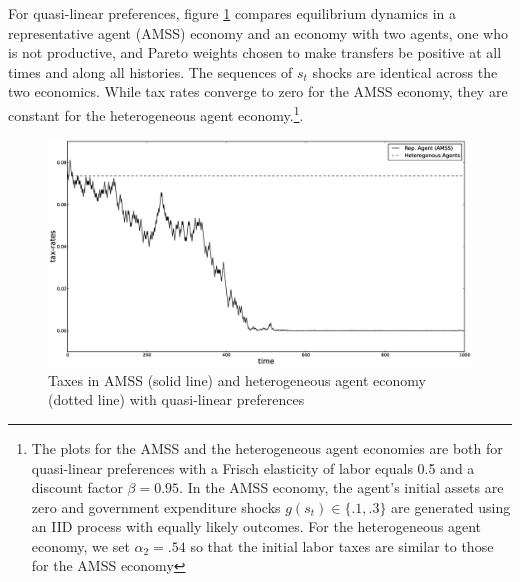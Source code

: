 \documentclass[thmsb,11pt]{article}
\begin{document}
For quasi-linear preferences, figure \ref{fig: AMSS vs BEGS} compares equilibrium dynamics in a
representative agent (AMSS) economy and an economy with two agents, one who
is not productive, and  Pareto weights chosen to make
transfers be positive at all times  and along all  histories. The sequences of $s_t$ shocks are identical across the two economics.
 While tax rates converge to zero for the AMSS economy, they are constant for the heterogeneous agent economy.\footnote{The plots for the AMSS and the heterogeneous agent economies are both  for quasi-linear preferences with a Frisch elasticity of labor equals 0.5 and a discount factor $\beta=0.95$. In the AMSS economy,  the agent's  initial assets are zero  and  government expenditure shocks $g(s_t) \in\{.1,.3\}$ are generated using an IID process with equally likely outcomes.  For the heterogeneous agent economy, we set  $\alpha_2=.54$ so that the initial labor taxes are similar to those for the AMSS economy}. %



  \begin{figure}[htp]
 \centering
 \includegraphics[width=\textwidth]{Draft25Graphs/BEGS_AMSS.eps}
 \caption{ Taxes in AMSS (solid line) and heterogeneous agent economy (dotted line) with quasi-linear preferences}
 \label{fig: AMSS vs BEGS}
 \end{figure}
\end{document}
